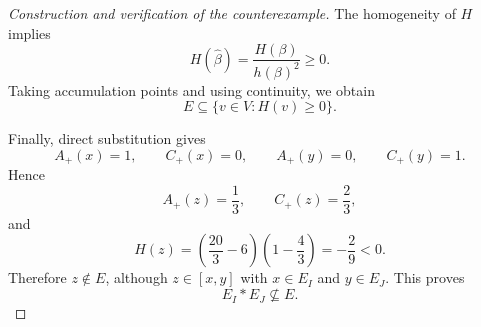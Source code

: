 \documentclass[11pt,reqno]{amsart}
\theoremstyle{plain}
\theoremstyle{definition}
\theoremstyle{remark}
\numberwithin{equation}{section}
\begin{document}
\begin{proof}[Construction and verification of the counterexample]
The homogeneity of $H$ implies
\[
H(\widehat\beta)=\frac{H(\beta)}{h(\beta)^2}\ge0.
\]
Taking accumulation points and using continuity, we obtain
\[
E\subseteq\{v\in V:H(v)\ge0\}.
\]

Finally, direct substitution gives
\[
A_+(x)=1,\qquad C_+(x)=0,
\qquad
A_+(y)=0,\qquad C_+(y)=1.
\]
Hence
\[
A_+(z)=\frac13,\qquad C_+(z)=\frac23,
\]
and
\[
H(z)
=
\left(\frac{20}{3}-6\right)
\left(1-\frac43\right)
=
-\frac29<0.
\]
Therefore $z\notin E$, although $z\in[x,y]$ with
$x\in E_I$ and $y\in E_J$. This proves
\[
E_I*E_J\not\subseteq E.
\]
\end{proof}



\end{document}

